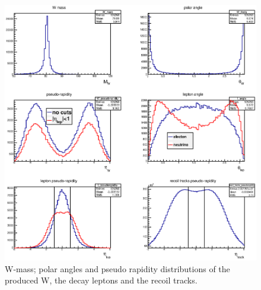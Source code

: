 \documentclass[12pt]{article}
\begin{document}

\begin{figure}[htbp]
\begin{center}
\includegraphics[width=14cm]{images/W_rapidity}
\end{center}
\caption{W-mass; polar angles and pseudo rapidity distributions of the produced W, the decay leptons and the recoil tracks.}
\label{fig:MC_W_eta} 
\end{figure}


\end{document}
